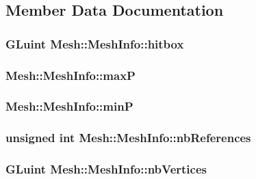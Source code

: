 \subsection{Member Data Documentation}
\hypertarget{struct_mesh_1_1_mesh_info_a325c495a1c63762bac63b3df9c9dfebf}{
\subsubsection[{hitbox}]{\setlength{\rightskip}{0pt plus 5cm}G\+Luint Mesh\+::\+Mesh\+Info\+::hitbox}}\label{struct_mesh_1_1_mesh_info_a325c495a1c63762bac63b3df9c9dfebf}
\hypertarget{struct_mesh_1_1_mesh_info_a1a3ed73fec39d12cf5fcd1dd554c2dea}{
\subsubsection[{max\+P}]{ Mesh\+::\+Mesh\+Info\+::max\+P}}\label{struct_mesh_1_1_mesh_info_a1a3ed73fec39d12cf5fcd1dd554c2dea}
\hypertarget{struct_mesh_1_1_mesh_info_add150c6f037445254a0ebee99abf3ba9}{
\subsubsection[{min\+P}]{ Mesh\+::\+Mesh\+Info\+::min\+P}}\label{struct_mesh_1_1_mesh_info_add150c6f037445254a0ebee99abf3ba9}
\hypertarget{struct_mesh_1_1_mesh_info_a8e32fc200e5ed8af32c409cac7b17342}{
\subsubsection[{nb\+References}]{\setlength{\rightskip}{0pt plus 5cm}unsigned int Mesh\+::\+Mesh\+Info\+::nb\+References}}\label{struct_mesh_1_1_mesh_info_a8e32fc200e5ed8af32c409cac7b17342}
\hypertarget{struct_mesh_1_1_mesh_info_a8869e5c769b3895876e32bed8252dffd}{
\subsubsection[{nb\+Vertices}]{\setlength{\rightskip}{0pt plus 5cm}G\+Luint Mesh\+::\+Mesh\+Info\+::nb\+Vertices}}\label{struct_mesh_1_1_mesh_info_a8869e5c769b3895876e32bed8252dffd}
